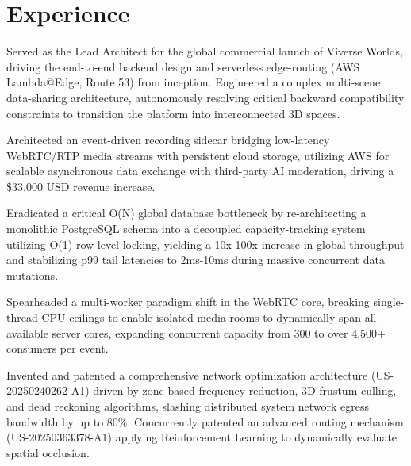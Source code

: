 \section{Experience}
\begin{resumeitems}
\item Served as the Lead Architect for the global commercial launch of Viverse Worlds, driving the end-to-end backend design and serverless edge-routing (AWS Lambda@Edge, Route 53) from inception. Engineered a complex multi-scene data-sharing architecture, autonomously resolving critical backward compatibility constraints to transition the platform into interconnected 3D spaces.
\item Architected an event-driven recording sidecar bridging low-latency WebRTC/RTP media streams with persistent cloud storage, utilizing AWS for scalable asynchronous data exchange with third-party AI moderation, driving a \$33,000 USD revenue increase.
\item Eradicated a critical O(N) global database bottleneck by re-architecting a monolithic PostgreSQL schema into a decoupled capacity-tracking system utilizing O(1) row-level locking, yielding a 10x-100x increase in global throughput and stabilizing p99 tail latencies to 2ms-10ms during massive concurrent data mutations.
\item Spearheaded a multi-worker paradigm shift in the WebRTC core, breaking single-thread CPU ceilings to enable isolated media rooms to dynamically span all available server cores, expanding concurrent capacity from 300 to over 4,500+ consumers per event.
\item Invented and patented a comprehensive network optimization architecture (US-20250240262-A1) driven by zone-based frequency reduction, 3D frustum culling, and dead reckoning algorithms, slashing distributed system network egress bandwidth by up to 80\%. Concurrently patented an advanced routing mechanism (US-20250363378-A1) applying Reinforcement Learning to dynamically evaluate spatial occlusion.
\end{resumeitems}
